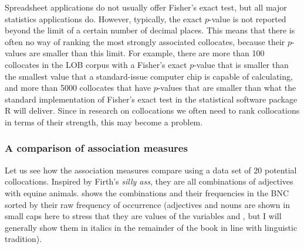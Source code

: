 Spreadsheet applications do not usually offer Fisher's exact test,  but all major statistics  applications do. However, typically, the exact $p$-value is not reported beyond the limit of a certain number of decimal places. This means that there is often no way of ranking the most strongly associated  collocates,  because their $p$-values are smaller than this limit. For example, there are more than 100 collocates in the LOB  corpus with a Fisher's exact $p$-value  that is smaller than the smallest value that a standard\hyp{}issue computer chip is capable of calculating, and more than 5000 collocates that have $p$-values that are smaller than what the standard implementation of Fisher's exact test in the statistical software package R will deliver. Since in research on collocations  we often need to rank collocations in terms of their strength, this may become a problem.

\subsubsection{A comparison of association measures}\label{sec:amcomparison}\largerpage

Let us see how the association measures compare using a data set of 20 potential collocations.  Inspired by Firth's \textit{silly ass}, they are all combinations of adjectives  with equine animals.  shows the combinations and their frequencies  in the BNC  sorted by their raw frequency of occurrence (adjectives  and nouns  are shown in small caps here to stress that they are values of the variables  and , but I will generally show them in italics in the remainder of the book in line with linguistic tradition).


